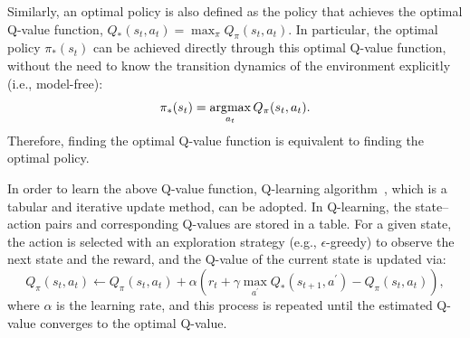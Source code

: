 Similarly, an optimal policy is also defined as the policy that achieves the optimal Q-value function, $Q_{*}(s_{t},a_{t})=\max_{\pi}Q_{\pi}(s_{t},a_{t})$.
In particular, the optimal policy $\pi_{*}(s_{t})$ can be achieved directly through this optimal Q-value function, without the need to know the transition dynamics of the environment explicitly (i.e., model-free):
\begin{equation}
    \pi_{*}(s_{t}) = \operatorname*{\arg\!\max}_{a_{t}} Q_{\pi}(s_{t}, a_{t}).
\end{equation}
Therefore, finding the optimal Q-value function is equivalent to finding the optimal policy. 

In order to learn the above Q-value function, Q-learning algorithm~\cite{watkins1992q}, which is a tabular and iterative update method, can be adopted. In Q-learning, the state--action pairs and corresponding Q-values are stored in a table. For a given state, the action is selected with an exploration strategy (e.g., $\epsilon$-greedy) to observe the next state and the reward, and the Q-value of the current state is updated via:
\begin{equation}
    Q_{\pi}(s_{t}, a_{t}) \leftarrow Q_{\pi}(s_{t}, a_{t}) + \alpha(r_{t} + \gamma\max_{a^{\prime}}Q_{*}(s_{t+1}, a^{\prime}) - Q_{\pi}(s_{t}, a_{t})),
\end{equation}
where $\alpha$ is the learning rate, and this process is repeated until the estimated Q-value converges to the optimal Q-value.

